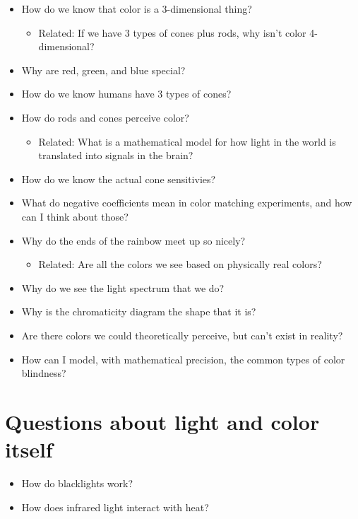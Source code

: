 \documentclass[
]{article}
\providecommand{\tightlist}{%
  \setlength{\itemsep}{0pt}\setlength{\parskip}{0pt}}
\begin{document}
\begin{itemize}
\tightlist
\item
  How do we know that color is a 3-dimensional thing?

  \begin{itemize}
  \tightlist
  \item
    Related: If we have 3 types of cones plus rods, why isn't color
    4-dimensional?
  \end{itemize}
\item
  Why are red, green, and blue special?
\item
  How do we know humans have 3 types of cones?
\item
  How do rods and cones perceive color?

  \begin{itemize}
  \tightlist
  \item
    Related: What is a mathematical model for how light in the world is
    translated into signals in the brain?
  \end{itemize}
\item
  How do we know the actual cone sensitivies?
\item
  What do negative coefficients mean in color matching experiments, and
  how can I think about those?
\item
  Why do the ends of the rainbow meet up so nicely?

  \begin{itemize}
  \tightlist
  \item
    Related: Are all the colors we see based on physically real colors?
  \end{itemize}
\item
  Why do we see the light spectrum that we do?
\item
  Why is the chromaticity diagram the shape that it is?
\item
  Are there colors we could theoretically perceive, but can't exist in
  reality?
\item
  How can I model, with mathematical precision, the common types of
  color blindness?
\end{itemize}

\hypertarget{questions-about-light-and-color-itself}{%
\section{Questions about light and color
itself}\label{questions-about-light-and-color-itself}}

\begin{itemize}
\tightlist
\item
  How do blacklights work?
\item
  How does infrared light interact with heat?
\end{itemize}
\end{document}

